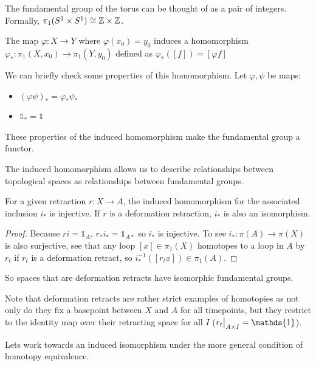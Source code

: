 \documentclass[10pt]{article}
\newcommand\restr[2]{{%
  \left.\kern-\nulldelimiterspace %
  #1 %
  \vphantom{\big|} %
  \right|_{#2} %
}}
\begin{document}
\begin{example}[Torus]
	The fundamental group of the torus can be thought of as a pair of integers. Formally, $\pi_1(S^1 \times S^1) \cong \mathbb{Z} \times \mathbb{Z}$. 
\end{example}


\begin{definition}
	The map $\varphi: X \to Y$ where $\varphi(x_0) = y_0$ induces a homomorphism $\varphi_*: \pi_1(X, x_0) \to \pi_1(Y, y_0)$ defined as $\varphi_*([f]) = [\varphi f]$
\end{definition}

We can briefly check some properties of this homomorphism. Let $\varphi, \psi$ be maps:
\begin{itemize}
	\item{$(\varphi\psi)_* = \varphi_*\psi_*$}
	\item{$\mathds{1}_* = \mathds{1}$}
\end{itemize}
These properties of the induced homomorphism make the fundamental group a functor.

The induced homomorphism allows us to describe relationships between topological spaces as relationships between fundamental groups.

\begin{proposition}[]
	For a given retraction $r: X \to A$, the induced homomorphism for the associated inclusion $i_*$ is injective. If $r$ is a deformation retraction, $i_*$ is also an isomorphism.
\end{proposition}

\begin{proof}
	Because $ri = \mathds{1}_A$, $r_*i_* = \mathds{1}_{A*}$ so $i_*$ is
	injective. To see $i_*: \pi(A) \to \pi(X)$ is also surjective, see that any
	loop $[x] \in \pi_1(X)$ homotopes to a loop in $A$ by $r_t$ if $r_t$ is a deformation
	retract, so $i_*^{-1}([r_tx]) \in \pi_1(A)$.
\end{proof}

So spaces that are deformation retracts have isomorphic fundamental groups.

Note that deformation retracts are rather strict examples of homotopies as not
only do they fix a basepoint between $X$ and $A$ for all timepoints, but they
restrict to the identity map over their retracting space for all $I$
($\restr{r_t}{A\times I} = \mathds{1}$). 

Lets work towards an induced isomorphism under the more general condition of
homotopy equivalence.
\end{document}
